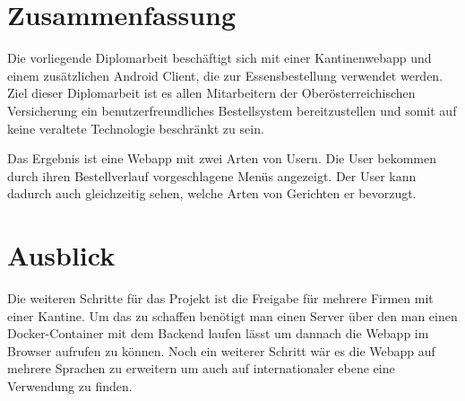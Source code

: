 \section{Zusammenfassung}
\author{Bozidar Spasenovic}
Die vorliegende Diplomarbeit beschäftigt sich mit einer Kantinenwebapp und einem zusätzlichen Android Client, die zur Essensbestellung
verwendet werden. Ziel dieser Diplomarbeit ist es allen Mitarbeitern der Oberösterreichischen Versicherung ein benutzerfreundliches Bestellsystem
bereitzustellen und somit auf keine veraltete Technologie beschränkt zu sein. 

Das Ergebnis ist eine Webapp mit zwei Arten von Usern. Die User bekommen durch ihren Bestellverlauf vorgeschlagene
Menüs angezeigt. Der User kann dadurch auch gleichzeitig sehen, welche Arten von Gerichten er bevorzugt.

\section{Ausblick}
Die weiteren Schritte für das Projekt ist die Freigabe für mehrere Firmen mit einer Kantine. Um das zu schaffen benötigt man einen Server
über den man einen Docker-Container mit dem Backend laufen lässt um dannach die Webapp im Browser aufrufen zu können. Noch ein
weiterer Schritt wär es die Webapp auf mehrere Sprachen zu erweitern um auch auf internationaler ebene eine Verwendung zu finden.
